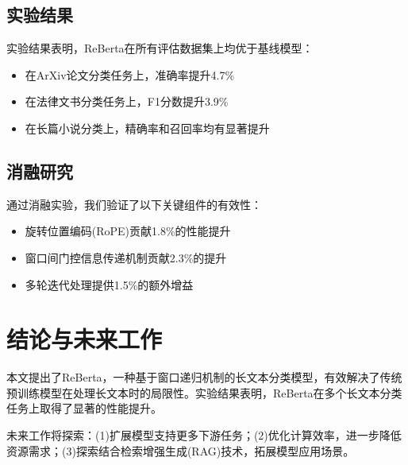 \documentclass[10pt,twocolumn,letterpaper]{article}
\begin{document}
\subsection{实验结果}
实验结果表明，ReBerta在所有评估数据集上均优于基线模型：
\begin{itemize}
    \item 在ArXiv论文分类任务上，准确率提升4.7\%
    \item 在法律文书分类任务上，F1分数提升3.9\%
    \item 在长篇小说分类上，精确率和召回率均有显著提升
\end{itemize}

\subsection{消融研究}
通过消融实验，我们验证了以下关键组件的有效性：
\begin{itemize}
    \item 旋转位置编码(RoPE)贡献1.8\%的性能提升
    \item 窗口间门控信息传递机制贡献2.3\%的提升
    \item 多轮迭代处理提供1.5\%的额外增益
\end{itemize}

\section{结论与未来工作}
本文提出了ReBerta，一种基于窗口递归机制的长文本分类模型，有效解决了传统预训练模型在处理长文本时的局限性。实验结果表明，ReBerta在多个长文本分类任务上取得了显著的性能提升。

未来工作将探索：(1)扩展模型支持更多下游任务；(2)优化计算效率，进一步降低资源需求；(3)探索结合检索增强生成(RAG)技术，拓展模型应用场景。



\end{document}

